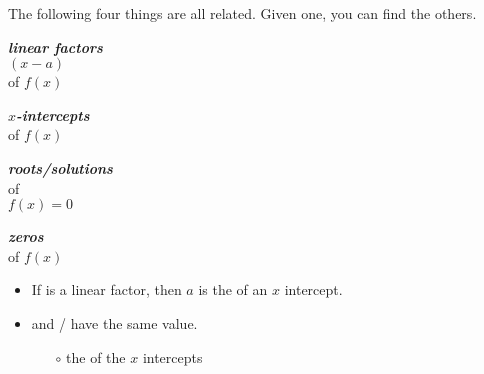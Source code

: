 


\begin{myConcept}{The following four things are all related. Given one, you can find the others.}
\begin{tcbraster}[
    raster columns=2, raster rows=2,
    raster left skip=1.25in, raster right skip=1.25in,
    raster column skip = 0.75in, raster row skip = 0.25in,
    raster equal height, 
    valign=center,
]
    \begin{tcolorbox}
        \begin{center}
            {\bfseries\itshape linear factors}\\[0.25em]
            {\large $(x-a)$}\\[0.25em]
            of $f(x)$
        \end{center}
    \end{tcolorbox}
    \begin{tcolorbox}
        \begin{center}
            {\bfseries\itshape $x$-intercepts}\\
            of $f(x)$
        \end{center}
    \end{tcolorbox}
    \begin{tcolorbox}
        \begin{center}
            {\bfseries\itshape roots/solutions}\\
            of\\
            $f(x)=0$
        \end{center}
    \end{tcolorbox}
    \begin{tcolorbox}
        \begin{center}
            {\bfseries\itshape zeros}\\ 
            of $f(x)$
        \end{center}
    \end{tcolorbox}
\end{tcbraster}

\begin{itemize}[fullwidth]
    \item If  is a linear factor, then $a$ is the  of an $x$ intercept.
    \item {} and / have the same value.
    \begin{itemize}
        \item[$\circ$] the  of the $x$ intercepts
    \end{itemize}
\end{itemize}
\end{myConcept}
